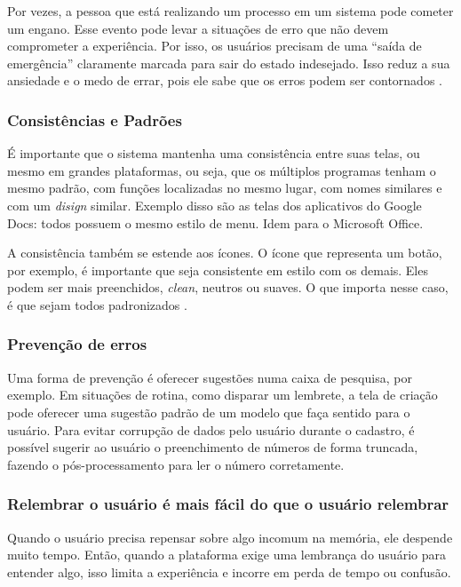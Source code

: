 Por vezes, a pessoa que está realizando um processo em um sistema pode cometer um engano. Esse evento pode levar a situações de erro que não devem comprometer a experiência. Por isso, os usuários precisam de uma “saída de emergência” claramente marcada para sair do estado indesejado. Isso reduz a sua ansiedade e o medo de errar, pois ele sabe que os erros podem ser contornados \cite{BarbosaEtAl2021InteracaoHumanoComputadorExperiencia}.

\subsubsection{Consistências e Padrões}

É importante que o sistema mantenha uma consistência entre suas telas, ou mesmo em grandes plataformas, ou seja, que os múltiplos programas tenham o mesmo padrão, com funções localizadas no mesmo lugar, com nomes similares e com um \textit{disign} similar. Exemplo disso são as telas dos aplicativos do Google Docs: todos possuem o mesmo estilo de menu. Idem para o Microsoft Office.

A consistência também se estende aos ícones. O ícone que representa um botão, por exemplo, é importante que seja consistente em estilo com os demais. Eles podem ser mais preenchidos, \textit{clean}, neutros ou suaves. O que importa nesse caso, é que sejam todos padronizados \cite{site:nielsenIcon}.


\subsubsection{Prevenção de erros}

Uma forma de prevenção é oferecer sugestões numa caixa de pesquisa, por exemplo. Em situações de rotina, como disparar um lembrete, a tela de criação pode oferecer uma sugestão padrão de um modelo que faça sentido para o usuário. Para evitar corrupção de dados pelo usuário durante o cadastro, é possível sugerir ao usuário o preenchimento de números de forma truncada, fazendo o pós-processamento para ler o número corretamente.

\subsubsection{Relembrar o usuário é mais fácil do que o usuário relembrar}

Quando o usuário precisa repensar sobre algo incomum na memória, ele despende muito tempo. Então, quando a plataforma exige uma lembrança do usuário para entender algo, isso limita a experiência e incorre em perda de tempo ou confusão.

